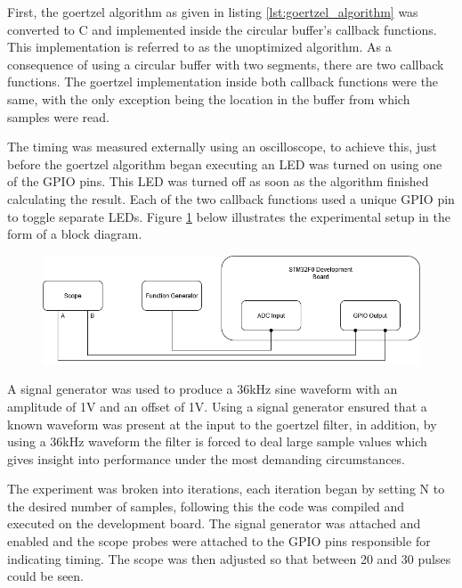 First, the goertzel algorithm as given in listing \ref{lst:goertzel_algorithm} was converted to C and implemented inside the circular buffer's callback functions. This implementation is referred to as the unoptimized algorithm. As a consequence of using a circular buffer with two segments, there are two callback functions. The goertzel implementation inside both callback functions were the same, with the only exception being the location in the buffer from which samples were read.

The timing was measured externally using an oscilloscope, to achieve this, just before the goertzel algorithm began executing an LED was turned on using one of the GPIO pins. This LED was turned off as soon as the algorithm finished calculating the result. Each of the two callback functions used a unique GPIO pin to toggle separate LEDs. Figure \ref{fig:goertzel_optimization_experiemnt} below illustrates the experimental setup in the form of a block diagram.

\begin{figure}[H]
	\centering
	\includegraphics[width=.9\linewidth]{figures/experimentation/goertzel_speed_test_diagram.png}
	\label{fig:goertzel_optimization_experiemnt}
\end{figure}

A signal generator was used to produce a 36kHz sine waveform with an amplitude of 1V and an offset of 1V. Using a signal generator ensured that a known waveform was present at the input to the goertzel filter, in addition, by using a 36kHz waveform the filter is forced to deal large sample values which gives insight into performance under the most demanding circumstances.

The experiment was broken into iterations, each iteration began by setting N to the desired number of samples, following this the code was compiled and executed on the development board. The signal generator was attached and enabled and the scope probes were attached to the GPIO pins responsible for indicating timing. The scope was then adjusted so that between 20 and 30 pulses could be seen. 

